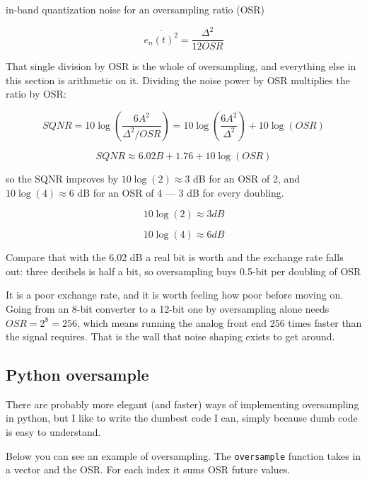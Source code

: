 in-band quantization noise for an oversampling ratio (OSR)

\[ \overline{e_n(t)^2} =\frac{\Delta^2}{12 OSR}\]

That single division by OSR is the whole of oversampling, and everything
else in this section is arithmetic on it. Dividing the noise power by
OSR multiplies the ratio by OSR:

\[ SQNR = 10 \log\left(\frac{6 A^2}{\Delta^2/OSR}\right) = 10 \log\left(\frac{6 A^2}{\Delta^2}\right) + 10 \log(OSR)\]

\[ SQNR \approx 6.02B + 1.76 + 10 \log(OSR)\]

so the SQNR improves by \(10\log(2) \approx 3\) dB for an OSR of 2, and
\(10\log(4) \approx 6\) dB for an OSR of 4 --- 3 dB for every doubling.

\[ 10 \log(2) \approx 3 dB\]

\[ 10 \log(4) \approx 6 dB\]

Compare that with the 6.02 dB a real bit is worth and the exchange rate
falls out: three decibels is half a bit, so oversampling buys 0.5-bit
per doubling of OSR

It is a poor exchange rate, and it is worth feeling how poor before
moving on. Going from an 8-bit converter to a 12-bit one by oversampling
alone needs \(OSR = 2^8 = 256\), which means running the analog front
end 256 times faster than the signal requires. That is the wall that
noise shaping exists to get around.

\subsection{Python oversample}\label{python-oversample}

There are probably more elegant (and faster) ways of implementing
oversampling in python, but I like to write the dumbest code I can,
simply because dumb code is easy to understand.

Below you can see an example of oversampling. The \texttt{oversample}
function takes in a vector and the OSR. For each index it sums OSR
future values.

\begin{Shaded}
\begin{Highlighting}[]
\OperatorTok{=} 
\OperatorTok{=}

     \NormalTok{(}
         \NormalTok{(}
\OperatorTok{=}\OperatorTok{+}
            \OperatorTok{\textless{}}
\OperatorTok{+=}
\end{Highlighting}
\end{Shaded}

